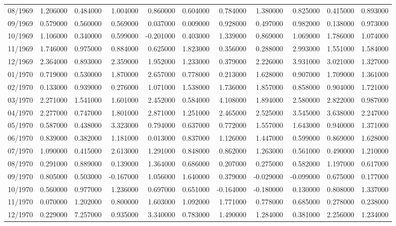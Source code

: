 \begin{tabular}{lrrrrrrrrrr}
08/1969 & 1.206000 & 0.484000 & 1.004000 & 0.860000 & 0.604000 & 0.784000 & 1.380000 & 0.825000 & 0.415000 & 0.893000 \\
09/1969 & 0.579000 & 0.560000 & 0.569000 & 0.037000 & 0.009000 & 0.928000 & 0.497000 & 0.982000 & 0.138000 & 0.973000 \\
10/1969 & 1.106000 & 0.340000 & 0.599000 & -0.201000 & 0.403000 & 1.339000 & 0.869000 & 1.069000 & 1.786000 & 1.074000 \\
11/1969 & 1.746000 & 0.975000 & 0.884000 & 0.625000 & 1.823000 & 0.356000 & 0.288000 & 2.993000 & 1.551000 & 1.584000 \\
12/1969 & 2.364000 & 0.893000 & 2.359000 & 1.952000 & 1.233000 & 0.379000 & 2.226000 & 3.931000 & 3.021000 & 1.327000 \\
01/1970 & 0.719000 & 0.530000 & 1.870000 & 2.657000 & 0.778000 & 0.213000 & 1.628000 & 0.907000 & 1.709000 & 1.361000 \\
02/1970 & 0.133000 & 0.939000 & 0.276000 & 1.071000 & 1.538000 & 1.736000 & 1.857000 & 0.858000 & 0.904000 & 1.721000 \\
03/1970 & 2.271000 & 1.541000 & 1.601000 & 2.452000 & 0.584000 & 4.108000 & 1.894000 & 2.580000 & 2.822000 & 0.987000 \\
04/1970 & 2.277000 & 0.747000 & 1.801000 & 2.871000 & 1.251000 & 2.465000 & 2.525000 & 3.545000 & 3.638000 & 2.247000 \\
05/1970 & 0.587000 & 0.438000 & 3.323000 & 0.794000 & 0.637000 & 0.772000 & 1.557000 & 1.643000 & 0.940000 & 1.371000 \\
06/1970 & 0.839000 & 0.382000 & 1.181000 & 0.013000 & 0.837000 & 1.126000 & 1.447000 & 0.599000 & 0.869000 & 1.628000 \\
07/1970 & 1.090000 & 0.415000 & 2.613000 & 1.291000 & 0.848000 & 0.862000 & 1.263000 & 0.561000 & 0.490000 & 1.210000 \\
08/1970 & 0.291000 & 0.889000 & 0.139000 & 1.364000 & 0.686000 & 0.207000 & 0.275000 & 0.582000 & 1.197000 & 0.617000 \\
09/1970 & 0.805000 & 0.503000 & -0.167000 & 1.056000 & 1.640000 & 0.379000 & -0.029000 & -0.099000 & 0.675000 & 0.177000 \\
10/1970 & 0.560000 & 0.977000 & 1.236000 & 0.697000 & 0.651000 & -0.164000 & -0.180000 & 0.130000 & 0.808000 & 1.337000 \\
11/1970 & 0.070000 & 1.202000 & 0.800000 & 1.603000 & 1.092000 & 1.771000 & 0.778000 & 0.685000 & 0.278000 & 0.238000 \\
12/1970 & 0.229000 & 7.257000 & 0.935000 & 3.340000 & 0.783000 & 1.490000 & 1.284000 & 0.381000 & 2.256000 & 1.234000 \\

\end{tabular}
